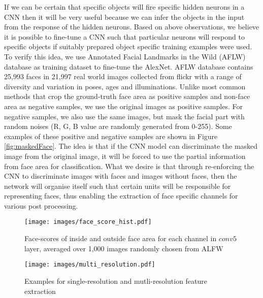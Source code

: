 \documentclass[10pt,twocolumn,letterpaper]{article}
\begin{document}
If we can be certain that specific objects will fire specific hidden neurons in a CNN then it will be very useful because we can infer the objects in the input from the response of the hidden neurons. Based on above observations, we believe it is possible to fine-tune a CNN such that particular neurons will respond to specific objects if suitably prepared object specific training examples were used. To verify this idea, we use Annotated Facial Landmarks in the Wild (AFLW) database \cite{kostinger2011annotated} as training dataset to fine-tune the AlexNet. AFLW database contains 25,993 faces in 21,997 real world images collected from flickr with a range of diversity and variation in poses, ages and illuminations. Unlike most common methods that crop the ground-truth face area as positive samples and non-face area as negative samples, we use the original images as positive samples. For negative samples, we also use the same images, but mask the facial part with random noises (R, G, B value are randomly generated from 0-255). Some examples of these positive and negative samples are shown in Figure \ref{fig:maskedFace}. The idea is that if the CNN model can discriminate the masked image from the original image, it will be forced to use the partial information from face area for classification. What we desire is that through re-enforcing the CNN to discriminate images with faces and images without faces, then the network will organise itself such that certain units will be responsible for representing faces, thus enabling the extraction of face specific channels for various post processing. %


\begin{figure*}[!htb]
\centering
\begin{minipage}{.55\textwidth}
  \centering
  \texttt{[image: images/face\_score\_hist.pdf]}
  \caption{Face-scores of inside and outside face area for each channel in $conv5$ layer, averaged over 1,000 images randomly chosen from ALFW}
  \label{fig:face_score}
\end{minipage}%
\hfill
\begin{minipage}{.4\textwidth}
  \centering
  \texttt{[image: images/multi\_resolution.pdf]}
  \caption{Examples for single-resolution and mutli-resolution feature extraction}
  \label{fig:multi_resolution}
\end{minipage}
\end{figure*}
\end{document}

